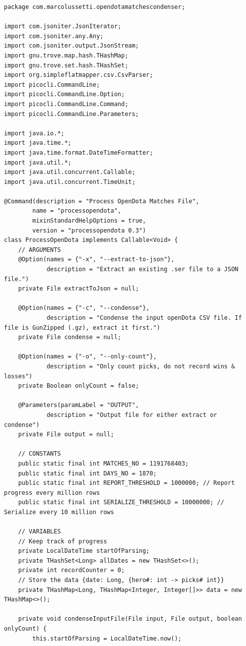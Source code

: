 \begin{verbatim}
package com.marcolussetti.opendotamatchescondenser;

import com.jsoniter.JsonIterator;
import com.jsoniter.any.Any;
import com.jsoniter.output.JsonStream;
import gnu.trove.map.hash.THashMap;
import gnu.trove.set.hash.THashSet;
import org.simpleflatmapper.csv.CsvParser;
import picocli.CommandLine;
import picocli.CommandLine.Option;
import picocli.CommandLine.Command;
import picocli.CommandLine.Parameters;

import java.io.*;
import java.time.*;
import java.time.format.DateTimeFormatter;
import java.util.*;
import java.util.concurrent.Callable;
import java.util.concurrent.TimeUnit;

@Command(description = "Process OpenDota Matches File",
        name = "processopendota",
        mixinStandardHelpOptions = true,
        version = "processopendota 0.3")
class ProcessOpenDota implements Callable<Void> {
    // ARGUMENTS
    @Option(names = {"-x", "--extract-to-json"},
            description = "Extract an existing .ser file to a JSON file.")
    private File extractToJson = null;

    @Option(names = {"-c", "--condense"},
            description = "Condense the input openDota CSV file. If file is GunZipped (.gz), extract it first.")
    private File condense = null;

    @Option(names = {"-o", "--only-count"},
            description = "Only count picks, do not record wins & losses")
    private Boolean onlyCount = false;

    @Parameters(paramLabel = "OUTPUT",
            description = "Output file for either extract or condense")
    private File output = null;

    // CONSTANTS
    public static final int MATCHES_NO = 1191768403;
    public static final int DAYS_NO = 1870;
    public static final int REPORT_THRESHOLD = 1000000; // Report progress every million rows
    public static final int SERIALIZE_THRESHOLD = 10000000; // Serialize every 10 million rows

    // VARIABLES
    // Keep track of progress
    private LocalDateTime startOfParsing;
    private THashSet<Long> allDates = new THashSet<>();
    private int recordCounter = 0;
    // Store the data {date: Long, {hero#: int -> picks# int}}
    private THashMap<Long, THashMap<Integer, Integer[]>> data = new THashMap<>();

    private void condenseInputFile(File input, File output, boolean onlyCount) {
        this.startOfParsing = LocalDateTime.now();


\end{verbatim}
